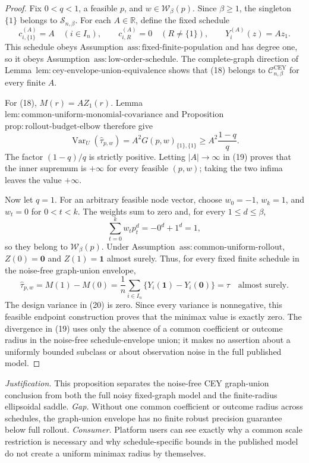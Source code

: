 \documentclass{article}
\begin{document}
\begin{proof}
Fix \(0<q<1\), a feasible \(p\), and \(w\in\mathcal W_\beta(p)\).  Since \(\beta\ge1\), the singleton \(\{1\}\) belongs to \(\mathcal S_{n,\beta}\).  For each \(A\in\mathbb R\), define the fixed schedule
\[
c^{(A)}_{i,\{1\}}=A\quad(i\in I_n),
\qquad
c^{(A)}_{i,R}=0\quad(R\ne\{1\}),
\qquad
Y_i^{(A)}(z)=Az_1.
\tag{18}
\]
This schedule obeys Assumption~\(\mathrm{ass{:}fixed\text{-}finite\text{-}population}\) and has degree one, so it obeys Assumption~\(\mathrm{ass{:}low\text{-}order\text{-}schedule}\).  The complete-graph direction of Lemma~\(\mathrm{lem{:}cey\text{-}envelope\text{-}union\text{-}equivalence}\) shows that (18) belongs to \(\mathcal C^{\mathrm{CEY}}_{n,\beta}\) for every finite \(A\).

For (18), \(M(r)=AZ_1(r)\).  Lemma~\(\mathrm{lem{:}common\text{-}uniform\text{-}monomial\text{-}covariance}\) and Proposition~\(\mathrm{prop{:}rollout\text{-}budget\text{-}elbow}\) therefore give
\[
\operatorname{Var}_U(\widehat\tau_{p,w})
=A^2G(p,w)_{\{1\},\{1\}}
\ge A^2\frac{1-q}{q}.
\tag{19}
\]
The factor \((1-q)/q\) is strictly positive.  Letting \(|A|\to\infty\) in (19) proves that the inner supremum is \(+\infty\) for every feasible \((p,w)\); taking the two infima leaves the value \(+\infty\).

Now let \(q=1\).  For an arbitrary feasible node vector, choose \(w_0=-1\), \(w_k=1\), and \(w_t=0\) for \(0<t<k\).  The weights sum to zero and, for every \(1\le d\le\beta\),
\[
\sum_{t=0}^kw_tp_t^d=-0^d+1^d=1,
\]
so they belong to \(\mathcal W_\beta(p)\).  Under Assumption~\(\mathrm{ass{:}common\text{-}uniform\text{-}rollout}\), \(Z(0)=\mathbf0\) and \(Z(1)=\mathbf1\) almost surely.  Thus, for every fixed finite schedule in the noise-free graph-union envelope,
\[
\widehat\tau_{p,w}
=M(1)-M(0)
=\frac1n\sum_{i\in I_n}\{Y_i(\mathbf1)-Y_i(\mathbf0)\}
=\tau
\quad\text{almost surely}.
\tag{20}
\]
The design variance in (20) is zero.  Since every variance is nonnegative, this feasible endpoint construction proves that the minimax value is exactly zero.  The divergence in (19) uses only the absence of a common coefficient or outcome radius in the noise-free schedule-envelope union; it makes no assertion about a uniformly bounded subclass or about observation noise in the full published model.
\end{proof}
\par\smallskip\noindent \textit{Justification.} This proposition separates the noise-free CEY graph-union conclusion from both the full noisy fixed-graph model and the finite-radius ellipsoidal saddle. \textit{Gap.} Without one common coefficient or outcome radius across schedules, the graph-union envelope has no finite robust precision guarantee below full rollout. \textit{Consumer.} Platform users can see exactly why a common scale restriction is necessary and why schedule-specific bounds in the published model do not create a uniform minimax radius by themselves.
\end{document}
